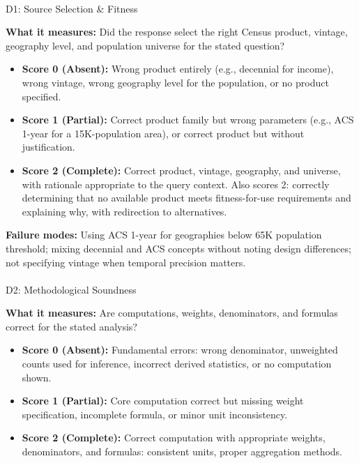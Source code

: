 \documentclass[
  11pt,
  letterpaper,
]{article}
\makeatletter
\let\oldparagraph\paragraph
\renewcommand{\paragraph}{
    \@ifstar
      \xxxParagraphStar
      \xxxParagraphNoStar
  }
\newcommand{\xxxParagraphStar}[1]{\oldparagraph*{#1}\mbox{}}
\newcommand{\xxxParagraphNoStar}[1]{\oldparagraph{#1}\mbox{}}
\providecommand{\tightlist}{%
  \setlength{\itemsep}{0pt}\setlength{\parskip}{0pt}}
\makeatother
\begin{document}
\paragraph{D1: Source Selection \&
Fitness}\label{d1-source-selection-fitness}

\textbf{What it measures:} Did the response select the right Census
product, vintage, geography level, and population universe for the
stated question?

\begin{itemize}
\tightlist
\item
  \textbf{Score 0 (Absent):} Wrong product entirely (e.g., decennial for
  income), wrong vintage, wrong geography level for the population, or
  no product specified.
\item
  \textbf{Score 1 (Partial):} Correct product family but wrong
  parameters (e.g., ACS 1-year for a 15K-population area), or correct
  product but without justification.
\item
  \textbf{Score 2 (Complete):} Correct product, vintage, geography, and
  universe, with rationale appropriate to the query context. Also scores
  2: correctly determining that no available product meets
  fitness-for-use requirements and explaining why, with redirection to
  alternatives.
\end{itemize}

\textbf{Failure modes:} Using ACS 1-year for geographies below 65K
population threshold; mixing decennial and ACS concepts without noting
design differences; not specifying vintage when temporal precision
matters.

\paragraph{D2: Methodological
Soundness}\label{d2-methodological-soundness}

\textbf{What it measures:} Are computations, weights, denominators, and
formulas correct for the stated analysis?

\begin{itemize}
\tightlist
\item
  \textbf{Score 0 (Absent):} Fundamental errors: wrong denominator,
  unweighted counts used for inference, incorrect derived statistics, or
  no computation shown.
\item
  \textbf{Score 1 (Partial):} Core computation correct but missing
  weight specification, incomplete formula, or minor unit inconsistency.
\item
  \textbf{Score 2 (Complete):} Correct computation with appropriate
  weights, denominators, and formulas: consistent units, proper
  aggregation methods.
\end{itemize}
\end{document}
